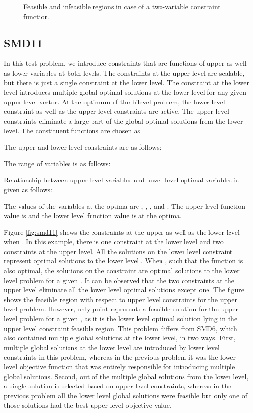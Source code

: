 \documentclass[twoside]{article}
\begin{document}
\begin{figure}
\begin{center}
\caption{Feasible and infeasible regions in case of a two-variable constraint function.}
\label{fig:cubicConst}
\end{center}
\end{figure}

\subsection{SMD11}
In this test problem, we introduce constraints that are functions of upper as well as lower variables at both levels. The constraints at the upper level are scalable, but there is just a single constraint at the lower level. The constraint at the lower level introduces multiple global optimal solutions at the lower level for any given upper level vector. At the optimum of the bilevel problem, the lower level constraint as well as the upper level constraints are active. The upper level constraints eliminate a large part of the global optimal solutions from the lower level. The constituent functions are chosen as

The upper and lower level constraints are as follows:

The range of variables is as follows:

Relationship between upper level variables and lower level optimal variables is given as follows:

The values of the variables at the optima are , , , and . The upper level function value is  and the
lower level function value is  at the optima.

Figure \ref{fig:smd11} shows the constraints at the upper as well as the lower level when . In this example, there is one constraint at the lower level and two constraints at the upper level. All the solutions on the lower level constraint represent optimal solutions to the lower level . When , such that the function  is also optimal, the solutions on the constraint are optimal solutions to the lower level problem  for a given . It can be observed that the two constraints at the upper level eliminate all the lower level optimal solutions except one. The figure shows the feasible region with respect to upper level constraints for the upper level problem. However, only point  represents a feasible solution for the upper level problem for a given , as it is the lower level optimal solution lying in the upper level constraint feasible region. This problem differs from SMD6, which also contained multiple global solutions at the lower level, in two ways. First, multiple global solutions at the lower level are introduced by lower level constraints in this problem, whereas in the previous problem it was the lower level objective function that was entirely responsible for introducing multiple global solutions. Second, out of the multiple global solutions from the lower level, a single solution is selected based on upper level constraints, whereas in the previous problem all the lower level global solutions were feasible but only one of those solutions had the best upper level objective value.
\end{document}
